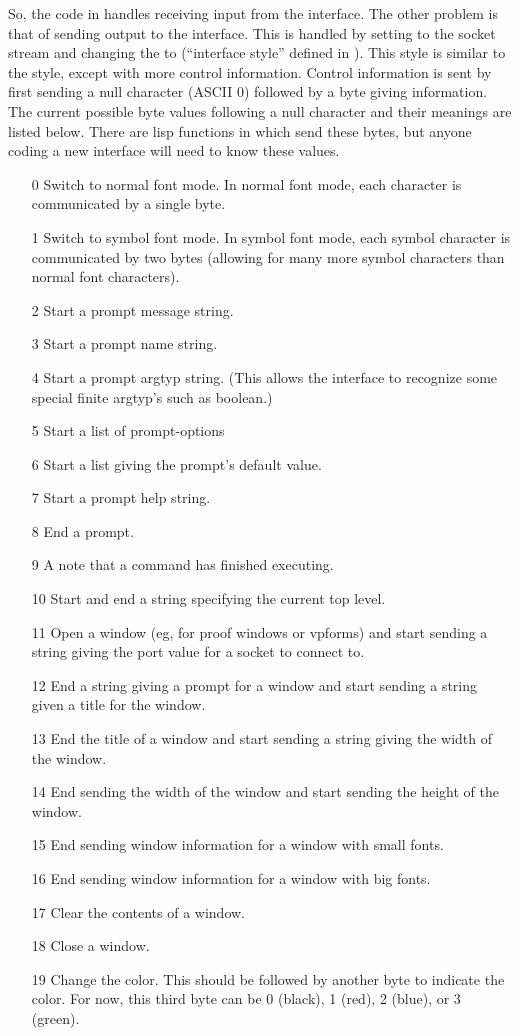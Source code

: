 So, the code in  handles
receiving input from the interface.  The other
problem is that of sending output to the interface.
This is handled by setting 
to the socket stream and changing the 
to  (``interface style'' defined in
).  This style
is similar to the  style, except with
more control information.  Control information is sent
by first sending a null character (ASCII 0) followed
by a byte giving information.  The current possible byte
values following a null character and their meanings
are listed below.  There are lisp functions in
 which send these bytes,
but anyone coding a new interface will need to know these values. 
\begin{enumerate}
\item [0] Switch to normal font mode.  In normal font mode,
  each character is communicated by a single byte.
\item [1] Switch to symbol font mode.  In symbol font mode,
  each symbol character is communicated by two bytes (allowing
  for many more symbol characters than normal font characters).
\item [2] Start a prompt message string.
\item [3] Start a prompt name string.
\item [4] Start a prompt argtyp string.  (This allows the interface to
recognize some special finite argtyp's such as boolean.)
\item [5] Start a list of prompt-options
\item [6] Start a list giving the prompt's default value.
\item [7] Start a prompt help string.
\item [8] End a prompt.
\item [9] A note that a command has finished executing.
\item [10] Start and end a string specifying the current top level.
\item [11] Open a window (eg, for proof windows or vpforms)
and start sending a string giving the
port value for a socket to connect to.
\item [12] End a string giving a prompt for a window and start sending
a string given a title for the window.
\item [13] End the title of a window and start sending a string
giving the width of the window.
\item [14] End sending the width of the window and start sending
the height of the window.
\item [15] End sending window information for a window with small fonts.
\item [16] End sending window information for a window with big fonts.
\item [17] Clear the contents of a window.
\item [18] Close a window.
\item [19] Change the color.  This should be followed by another
byte to indicate the color.  For now, this third byte can be
0 (black), 1 (red), 2 (blue), or 3 (green).
\end{enumerate}

